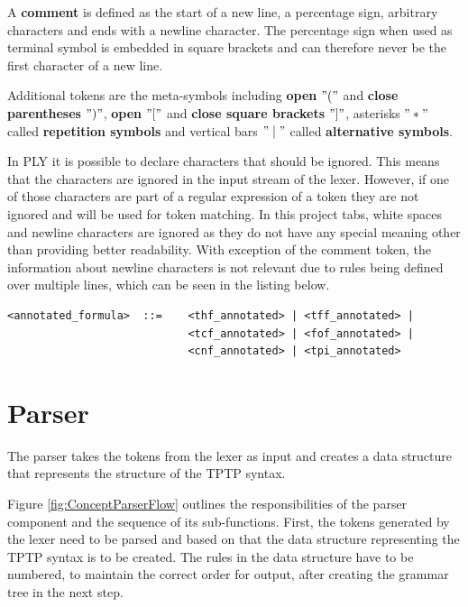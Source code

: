 A \textbf{comment} is defined as the start of a new line, a percentage sign, arbitrary characters and ends with a newline character.
The percentage sign when used as terminal symbol is embedded in square brackets and can therefore never be the first character of a new line.

Additional tokens are the meta-symbols including \textbf{open} $"("$ and \textbf{close parentheses} $")"$, \textbf{open} $"["$ and \textbf{close square brackets} $"]"$, asterisks $"*"$ called \textbf{repetition symbols} and vertical bars $"\mid"$ called \textbf{alternative symbols}.

In PLY it is possible to declare characters that should be ignored. This means that the characters are ignored in the input stream of the lexer. However, if one of those characters are part of a regular expression of a token they are not ignored and will be used for token matching. In this project tabs, white spaces and newline characters are ignored as they do not have any special meaning other than providing better readability. With exception of the comment token, the information about newline characters is not relevant due to rules being defined over multiple lines, which can be seen in the listing below.
\begin{lstlisting}[caption= Example of rules defined over multiple lines]
<annotated_formula>  ::=    <thf_annotated> | <tff_annotated> |
                            <tcf_annotated> | <fof_annotated> |
                            <cnf_annotated> | <tpi_annotated>
\end{lstlisting}

\section{Parser}\label{sec:ConceptParser}
The parser takes the tokens from the lexer as input and creates a data structure that represents the structure of the \ac{TPTP} syntax.

Figure \ref{fig:ConceptParserFlow} outlines the responsibilities of the parser component and the sequence of its sub-functions.
First, the tokens generated by the lexer need to be parsed and based on that the data structure representing the \ac{TPTP} syntax is to be created.
The rules in the data structure have to be numbered, to maintain the correct order for output, after creating the grammar tree in the next step.

